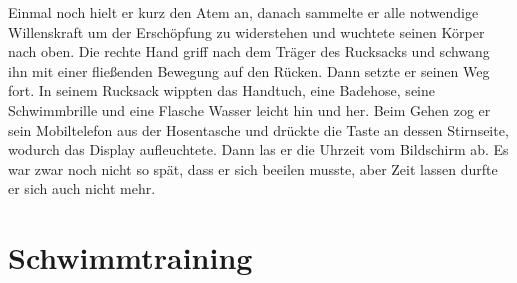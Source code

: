 \documentclass[ngerman,smalldemyvopaper,11pt,oneside,onecolumn,openright,extrafontsizes]{memoir}
\begin{document}
Einmal noch hielt er kurz den Atem an, danach sammelte er alle notwendige Willenskraft um der Erschöpfung zu widerstehen und wuchtete seinen Körper nach oben. Die rechte Hand griff nach dem Träger des Rucksacks und schwang ihn mit einer fließenden Bewegung auf den Rücken. Dann setzte er seinen Weg fort. In seinem Rucksack wippten das Handtuch, eine Badehose, seine Schwimmbrille und eine Flasche Wasser leicht hin und her. Beim Gehen zog er sein Mobiltelefon aus der Hosentasche und drückte die Taste an dessen Stirnseite, wodurch das Display aufleuchtete. Dann las er die Uhrzeit vom Bildschirm ab. Es war zwar noch nicht so spät, dass er sich beeilen musste, aber Zeit lassen durfte er sich auch nicht mehr.
\chapter{Schwimmtraining}
\end{document}
